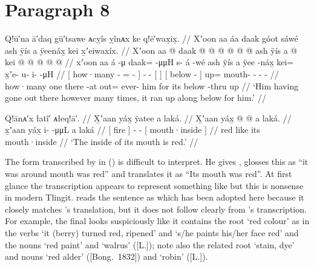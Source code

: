 \clearpage
\section{Paragraph 8}\label{sec:89-para-8}

\ex\label{ex:89-122-ran-up-below}%
%
\begingl
	\glpreamble	Q!ū′na ā′daq gū′tsawe ᴀcỵîs ỵînᴀx ke q!ē′wax̣ix̣. //
	\glpreamble	Xʼoon aa áa daak góot sáwé ash ÿís a ÿeenáx̱ kei x̱ʼeiwaxíx. //
	\gla	{} Xʼoon aa  @ {}
			daak @  @ {} @ {} @ {} {}
		 @ {} @ {}
		{} ash ÿís {}
		{} a  @ {} {}
		kei @  @ {} @ {} @ {} @ {} //
	\glb	{} xʼoon aa á -μ
			daak= {}  -μμH {} {}
		s- á -wé
		{} ash ÿís {}
		{} a ÿee -náx̱ {}
		kei= x̱ʼe- u- i-  -μH //
	\glc	{}[ how·many   -
			= \·  - \· {}]
		-  -
		{}[   {}]
		{}[  below - {}]
		up= mouth- - -  - //
	\gld	{} how·many one there -at out=  {} {} {} {}
		ever-  {}
		{} him for {}
		{} its below -thru {}
		up\•  {} {} {} {} //
	\glft	‘Him having gone out there however many times, it ran up along below for him.’
		//
\endgl
\xe

\ex\label{ex:89-123-mouth-inside-red}%
%
\begingl
	\glpreamble	Q!ānᴀ′x łatî′ ᴀłeq!ā′. //
	\glpreamble	X̱ʼaan yáx̱ ÿatee a laká. //
	\gla	{} X̱ʼaan yáx̱ {}
		 @ {} @ {}
		{} a laká. {} //
	\glb	{} x̱ʼaan yáx̱ {}
		i-  -μμL
		{} a laká {} //
	\glc	{}[ fire  {}]
		-  -
		{}[  mouth·inside {}] //
	\gld	{} red like {}
		 {} {}
		{} its mouth·inside {} //
	\glft	‘The inside of its mouth is red.’
		//
\endgl
\xe

The form transcribed by \citeauthor{swanton:1909} in (\lastx) is difficult to interpret.
He gives , glosses this as “it was around mouth was red” and translates it as “Its mouth was red”.
At first glance the transcription appears to represent something like  but this is nonsense in modern Tlingit.
\citeauthor{leer:1977} reads the sentence as  \parencite[7]{leer:1977} which has been adopted here because it closely matches \citeauthor{swanton:1909}’s translation, but it does not follow clearly from \citeauthor{swanton:1909}’s transcription.
For example, the final  looks suspiciously like it contains the root  ‘red colour’ as in the verbs  ‘it (berry) turned red, ripened’ and  ‘s/he paints his/her face red’ and the nouns  ‘red paint’ and  ‘walrus’ ([L.]); note also the related root  ‘stain, dye’ and nouns  ‘red alder’ ([Bong.\ 1832]) and  ‘robin’ ([L.]).


